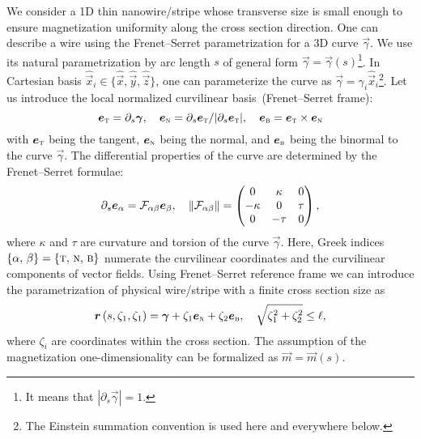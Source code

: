 We consider a 1D thin nanowire/stripe whose transverse size is small enough to ensure magnetization uniformity along the cross section direction. One can describe a wire using the Frenet--Serret parametrization for a 3D curve $\vec{\gamma}$. We use its natural parametrization by arc length $s$ of general form $\vec{\gamma}=\vec{\gamma}(s)$\footnote{It means that $|\partial_s\vec{\gamma}|=1$.}. In Cartesian basis $\hat{\vec{x}}_i\in\{\hat{\vec{x}},\hat{\vec{y}},\hat{\vec{z}}\}$, one can parameterize the curve as $\vec{\gamma}=\gamma_i\hat{\vec{x}}_i$\footnote{The Einstein summation convention is used here and everywhere below.}. Let
us introduce the local normalized curvilinear basis~(Frenet--Serret frame):
\begin{equation}\label{eq:FrenetSerret_basis}
\vec{e}_\textsc{t}=\partial_s \vec{\gamma},\quad \vec{e}_\textsc{n}=\partial_s\vec{e}_\textsc{t}/|\partial_s\vec{e}_\textsc{t}|,\quad \vec{e}_\textsc{b}=\vec{e}_\textsc{t}\times\vec{e}_\textsc{n}
\end{equation}
with $\vec{e}_\textsc{t}$ being the tangent, $\vec{e}_\textsc{n}$ being the normal, and $\vec{e}_\textsc{b}$ being the binormal to the curve $\vec{\gamma}$. The differential properties of the curve are determined by the Frenet--Serret formulae:
\begin{equation}\notag
\partial_s\vec{e}_\alpha = \mathcal{F}_{\alpha\beta}\vec{e}_\beta,\quad \|\mathcal{F}_{\alpha\beta}\|=\left(
\begin{matrix}
0&\kappa&0\\
-\kappa&0&\tau\\
0&-\tau&0
\end{matrix}\right),
\end{equation}
where $\kappa$ and $\tau$ are curvature and torsion of the curve $\vec{\gamma}$. Here, Greek indices $\{\alpha,\, \beta\} = \{\textsc{t},\, \textsc{n},\, \textsc{b}\}$ numerate the curvilinear coordinates and the curvilinear components of vector fields.
Using Frenet--Serret reference frame we can introduce the parametrization of physical wire/stripe with a finite cross section size as
\begin{equation}\notag
\vec{r}\left(s,\zeta_1,\zeta_1\right)=\vec{\gamma}+\zeta_1\vec{e}_\textsc{n}+\zeta_2\vec{e}_\textsc{b},\quad \sqrt{\zeta_1^2+\zeta_2^2}\leq \ell,
\end{equation}
where $\zeta_i$ are coordinates within the cross section. The assumption of the magnetization one-dimensionality can be formalized as $\vec{m}=\vec{m}(s)$.


